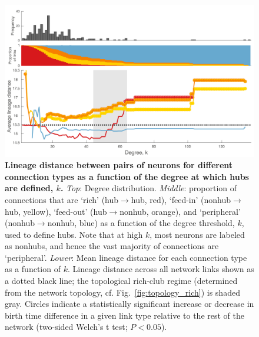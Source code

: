 \documentclass[10pt,letterpaper]{article}
\begin{document}
\begin{figure}[!h]
\centering
    \includegraphics[width=1\textwidth]{lineageDistanceRPF.pdf}
    \caption{
    \textbf{Lineage distance between pairs of neurons for different connection types as a function of the degree at which hubs are defined, $k$.}
    \emph{Top}: Degree distribution.
\emph{Middle}: proportion of connections that are `rich' (hub$\rightarrow$hub, red), `feed-in' (nonhub$\rightarrow$hub, yellow), `feed-out' (hub$\rightarrow$nonhub, orange), and `peripheral' (nonhub$\rightarrow$nonhub, blue) as a function of the degree threshold, $k$, used to define hubs.
Note that at high $k$, most neurons are labeled as nonhubs, and hence the vast majority of connections are `peripheral'.
\emph{Lower}: Mean lineage distance for each connection type as a function of $k$.
Lineage distance across all network links shown as a dotted black line; the topological rich-club regime (determined from the network topology, cf. Fig.~\ref{fig:topology_rich}) is shaded gray.
Circles indicate a statistically significant increase or decrease in birth time difference in a given link type relative to the rest of the network (two-sided Welch’s t test; $P < 0.05$).
}
\label{fig:Lineagek}
\end{figure}
\end{document}
